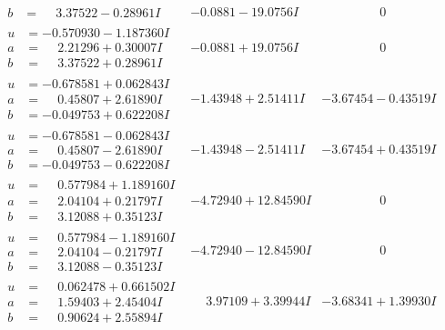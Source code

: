 \documentclass[1p]{elsarticle_modified}
\theoremstyle{definition}
\begin{document}
$$\begin{array}{c|c|c}
\begin{aligned}
b &= \phantom{-}3.37522 - 0.28961 I\end{aligned}
 & -0.0881 - 19.0756 I & \phantom{-0.000000 } 0 \\ \hline\begin{aligned}
u &= -0.570930 - 1.187360 I \\
a &= \phantom{-}2.21296 + 0.30007 I \\
b &= \phantom{-}3.37522 + 0.28961 I\end{aligned}
 & -0.0881 + 19.0756 I & \phantom{-0.000000 } 0 \\ \hline\begin{aligned}
u &= -0.678581 + 0.062843 I \\
a &= \phantom{-}0.45807 + 2.61890 I \\
b &= -0.049753 + 0.622208 I\end{aligned}
 & -1.43948 + 2.51411 I & -3.67454 - 0.43519 I \\ \hline\begin{aligned}
u &= -0.678581 - 0.062843 I \\
a &= \phantom{-}0.45807 - 2.61890 I \\
b &= -0.049753 - 0.622208 I\end{aligned}
 & -1.43948 - 2.51411 I & -3.67454 + 0.43519 I \\ \hline\begin{aligned}
u &= \phantom{-}0.577984 + 1.189160 I \\
a &= \phantom{-}2.04104 + 0.21797 I \\
b &= \phantom{-}3.12088 + 0.35123 I\end{aligned}
 & -4.72940 + 12.84590 I & \phantom{-0.000000 } 0 \\ \hline\begin{aligned}
u &= \phantom{-}0.577984 - 1.189160 I \\
a &= \phantom{-}2.04104 - 0.21797 I \\
b &= \phantom{-}3.12088 - 0.35123 I\end{aligned}
 & -4.72940 - 12.84590 I & \phantom{-0.000000 } 0 \\ \hline\begin{aligned}
u &= \phantom{-}0.062478 + 0.661502 I \\
a &= \phantom{-}1.59403 + 2.45404 I \\
b &= \phantom{-}0.90624 + 2.55894 I\end{aligned}
 & \phantom{-}3.97109 + 3.39944 I & -3.68341 + 1.39930 I \\ \hline\begin{aligned}

\end{aligned}
\end{array}$$
\end{document}
